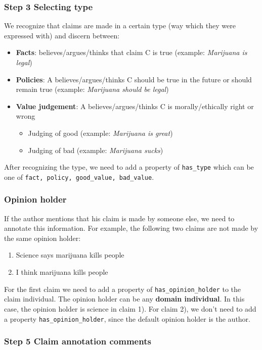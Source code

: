 \subsubsection*{Step 3 Selecting type}

We recognize that claims are made in a certain type (way which they were
expressed with) and discern between:

\begin{itemize}
\item \textbf{Facts}:  believes/argues/thinks that claim C is true (example:
	\textit{Marijuana is legal})
\item \textbf{Policies}: A believes/argues/thinks C should be true in the
	future or should remain true  (example: \textit{Marijuana should be legal}) 
\item \textbf{Value judgement}: A believes/argues/thinks C is morally/ethically
	right or wrong
	\begin{itemize}
	\item Judging of good (example: \textit{Marijuana is great})
	\item Judging of bad (example: \textit{Marijuana sucks})
	\end{itemize}
\end{itemize}
After recognizing the type, we need to add a property of \texttt{has\_type} which
can be one of \texttt{fact, policy, good\_value, bad\_value}. 

\subsubsection*{Opinion holder}

If the author mentions that his claim is made by someone else, we need to
annotate this information. For example, the following two claims are not made
by the same opinion holder:

\begin{enumerate}
\item Science says marijuana kills people
\item I think marijuana kills people
\end{enumerate}
For the first claim we need to add a property of \texttt{has\_opinion\_holder} to the
claim individual. The opinion holder can be any \textbf{domain individual}. In this
case, the opinion holder is science in claim 1). For claim 2), we don't need to
add a property \texttt{has\_opinion\_holder}, since the default opinion holder is the
author. 

\subsubsection*{Step 5 Claim annotation comments}

